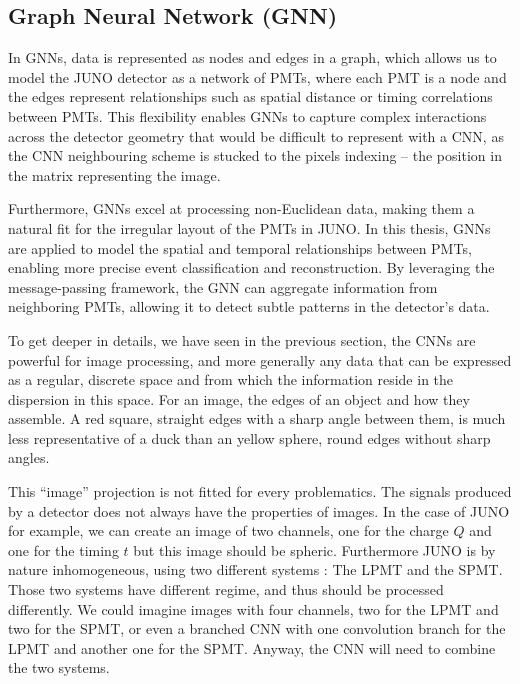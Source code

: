 \documentclass[../main.tex]{subfiles}
\begin{document}
\subsection{Graph Neural Network (GNN)}
\label{sec:ml:gnn}

In GNNs, data is represented as nodes and edges in a graph, which allows us to model the JUNO detector as a network of PMTs, where each PMT is a node and the edges represent relationships such as spatial distance or timing correlations between PMTs. This flexibility enables GNNs to capture complex interactions across the detector geometry that would be difficult to represent with a CNN, as the CNN neighbouring scheme is stucked to the pixels indexing -- the position in the matrix representing the image.

Furthermore, GNNs excel at processing non-Euclidean data, making them a natural fit for the irregular layout of the PMTs in JUNO.
In this thesis, GNNs are applied to model the spatial and temporal relationships between PMTs, enabling more precise event classification and reconstruction. By leveraging the message-passing framework, the GNN can aggregate information from neighboring PMTs, allowing it to detect subtle patterns in the detector's data.

To get deeper in details, we have seen in the previous section, the CNNs are powerful for image processing, and more generally any data that can be expressed as a regular, discrete space and from which the information reside in the dispersion in this space. For an image, the edges of an object and how they assemble. A red square, straight edges with a sharp angle between them, is much less representative of a duck than an yellow sphere, round edges without sharp angles.

This ``image'' projection is not fitted for every problematics. The signals produced by a detector does not always have the properties of images. In the case of JUNO for example, we can create an image of two channels, one for the charge $Q$ and one for the timing $t$ but this image should be spheric. Furthermore JUNO is by nature inhomogeneous, using two different systems : The LPMT and the SPMT. Those two systems have different regime, and thus should be processed differently. We could imagine images with four channels, two for the LPMT and two for the SPMT, or even a branched CNN with one convolution branch for the LPMT and another one for the SPMT. Anyway, the CNN will need to combine the two systems.
\end{document}

